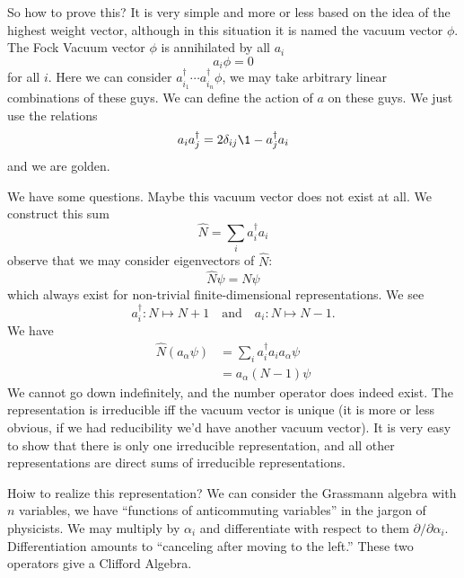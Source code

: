 So how to prove this? It is very simple and more or less based on
the idea of the highest weight vector, although in this situation
it is named the vacuum vector $\phi$. The Fock
Vacuum vector $\phi$ is annihilated by all $a_{i}$
\begin{equation}
a_{i}\phi = 0
\end{equation}
for all $i$. Here we can consider $a_{i_{1}}^{\dagger}\cdots
a_{i_{n}}^{\dagger}\phi$, we may take arbitrary linear
combinations of these guys. We can define the action of $a$ on
these guys. We just use the relations
\begin{equation}
a_{i}a_{j}^{\dagger}=2\delta_{ij}\1-a_{j}^{\dagger}a_{i}
\end{equation}
and we are golden.

We have some questions. Maybe this vacuum vector does not exist
at all. We construct this sum
\begin{equation}
\widehat{N}=\sum_{i}a_{i}^{\dagger}a_{i}
\end{equation}
observe that we may consider eigenvectors of $\widehat{N}$:
\begin{equation}
\widehat{N}\psi=N\psi
\end{equation}
which always exist for non-trivial finite-dimensional
representations. We see
\begin{equation}
a_{i}^{\dagger}\colon N\mapsto N+1 \quad\mbox{and}\quad
a_{i}\colon N\mapsto N-1.
\end{equation}
We have
\begin{subequations}
\begin{align}
\widehat{N}(a_{\alpha}\psi)
&= \sum_{i}a_{i}^{\dagger}a_{i}a_{\alpha}\psi\\
&= a_{\alpha}(N-1)\psi
\end{align}
\end{subequations}
We cannot go down indefinitely, and the number operator does
indeed exist. The representation is irreducible iff the vacuum
vector is unique (it is more or less obvious, if we had
reducibility we'd have another vacuum vector). It is very easy to
show that there is only one irreducible representation, and all
other representations are direct sums of irreducible
representations.

\begin{rmk}
Hoiw to realize this representation? We can consider the
Grassmann algebra with $n$ variables, we have ``functions of
anticommuting variables'' in the jargon of physicists. We may
multiply by $\alpha_{i}$ and differentiate with respect to them
$\partial/\partial\alpha_{i}$. Differentiation amounts to
``canceling after moving to the left.'' These two operators give
a Clifford Algebra.
\end{rmk}

